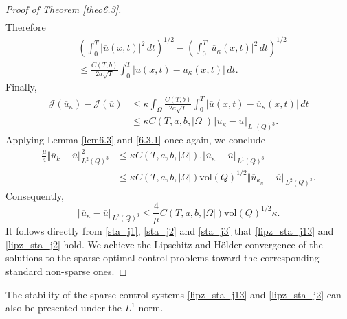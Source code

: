 \documentclass[reqno]{amsart}
\begin{document}
\begin{proof}[Proof of Theorem \ref{theo6.3}]
\begin{align*}
		\end{align*}
		Therefore
		\begin{align*}
			&\left( \int_0^T \vert \overline{u}(x,t) \vert^2 \, dt\right)^{1/2} - \left( \int_0^T \vert \overline{u}_{\kappa}(x,t) \vert^2 \, dt\right)^{1/2} \\
			&\leq \frac{C(T,b)}{2a\sqrt{T}} \int_0^T \vert \overline{u}(x,t) - \overline{u}_{\kappa}(x,t) \vert \, dt.
		\end{align*}
		Finally,
		\begin{align*}
			\mathcal{J}({\overline{u}}_{\kappa}) - \mathcal{J}(\overline{u}) &\leq \kappa \int_\Omega \frac{C(T,b)}{2a\sqrt{T}} \int_0^T \vert \overline{u}(x,t) - \overline{u}_{\kappa}(x,t) \vert \, dt \\
			&\leq \kappa C(T,a,b,\vert\Omega\vert) \Vert \overline{u}_{\kappa} - \overline{u} \Vert_{L^1(Q)^3}.
		\end{align*}
		Applying Lemma \ref{lem6.3} and \eqref{6.3.1} once again, we conclude
		\begin{align*}
			\frac{\mu}{4} \Vert \overline{u}_k - \overline{u} \Vert_{L^2(Q)^3}^2 &\leq \kappa C(T,a,b,\vert\Omega\vert).\Vert \overline{u}_{\kappa} - \overline{u}\Vert_{L^1(Q)^3} \\
			&\leq \kappa C(T,a,b,\vert\Omega\vert) \text{vol}(Q)^{1/2} \Vert \overline{u}_{\kappa_n}- \overline{u} \Vert_{L^2(Q)^3}.
		\end{align*}
		Consequently,
		\begin{equation} \label{sta_j3}
			\Vert \overline{u}_{\kappa} - \overline{u} \Vert_{L^2(Q)^3} \leq \frac{4}{\mu}C(T,a,b,\vert\Omega\vert) \text{vol}(Q)^{1/2} \kappa.
		\end{equation}
		It follows directly from \eqref{sta_j1}, \eqref{sta_j2} and \eqref{sta_j3} that \eqref{lipz_sta_j13} and \eqref{lipz_sta_j2} hold. We achieve the Lipschitz and H\"older convergence of the solutions to the sparse optimal control problems toward the corresponding standard non-sparse ones.
	\end{proof}
	\begin{remark}
		\rm{ The stability of the sparse control systems \eqref{lipz_sta_j13} and \eqref{lipz_sta_j2} can also be presented under the $L^1$-norm. }
	\end{remark}
	
\end{document}
